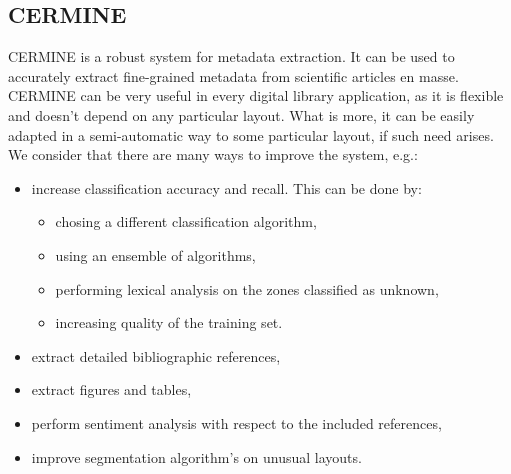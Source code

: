 \subsection{CERMINE}
CERMINE is a robust system for metadata extraction. It can be used to accurately extract fine-grained metadata from scientific articles en masse. CERMINE can be very useful in every digital library application, as it is flexible and doesn't depend on any particular layout. What is more, it can be easily adapted in a semi-automatic way to some particular layout, if such need arises.
\quad
We consider that there are many ways to improve the system, e.g.:
\begin{itemize}
\item increase classification accuracy and recall. This can be done by:
	\begin{itemize}
		\item chosing a different classification algorithm,
		\item using an ensemble of algorithms,
		\item performing lexical analysis on the zones classified as unknown,
		\item increasing quality of the training set.
	\end{itemize}
\item extract detailed bibliographic references,
\item extract figures and tables,
\item perform sentiment analysis with respect to the included references,
\item improve segmentation algorithm's on unusual layouts.
\end{itemize}